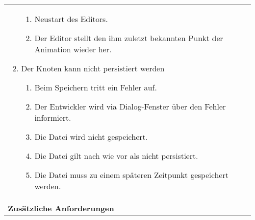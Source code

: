 \begin{longtabu}{p{0.5\textwidth}p{0.5\textwidth}}
\begin{enumerate}[label= (\alph*)]
{\begin{enumerate}[label= (\roman*)]
                        \item{Neustart des Editors.}
                        \item{Der Editor stellt den ihm zuletzt bekannten
                                Punkt der Animation wieder her.}
                \end{enumerate}
            }
            \item{Der Knoten kann nicht persistiert werden
                    \begin{enumerate}[label= (\roman*)]
                        \item{Beim Speichern tritt ein Fehler auf.}
                        \item{Der Entwickler wird via Dialog-Fenster über den Fehler
                                informiert.}
                        \item{Die Datei wird nicht gespeichert.}
                        \item{Die Datei gilt nach wie vor als nicht persistiert.}
                        \item{Die Datei muss zu einem späteren Zeitpunkt
                                gespeichert werden.}
                    \end{enumerate}
                }
        \end{enumerate}
        \\
    \cmidrule(r){1-1}\cmidrule(lr){2-2}
        \textbf{Zusätzliche Anforderungen} &
        ---\\
    \bottomrule
\end{longtabu}

